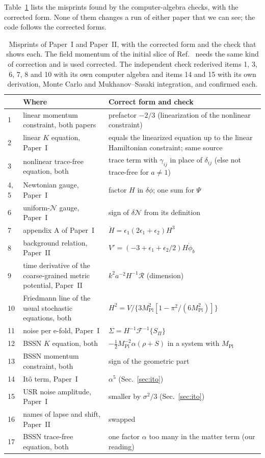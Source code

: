 \documentclass[aps,prd,twocolumn,10pt,superscriptaddress,nofootinbib,longbibliography,floatfix]{revtex4-2}
\newcommand{\Mpl}{M_\mathrm{Pl}}
\newcommand{\Pone}{Paper~I}
\newcommand{\Ptwo}{Paper~II}
\begin{document}
Table~\ref{tab:errata} lists the misprints found by the computer-algebra checks, with the corrected form. None of them changes a run of either paper that we can see; the code follows the corrected forms.

\begin{table}
\caption{Misprints of \Pone{} and \Ptwo{}, with the corrected form and the check that shows each. The field momentum of the initial slice of Ref.~\cite{Launay:2025bd} needs the same kind of correction and is used corrected. The independent check rederived items 1, 3, 6, 7, 8 and 10 with its own computer algebra and items 14 and 15 with its own derivation, Monte Carlo and Mukhanov--Sasaki integration, and confirmed each.}
\label{tab:errata}
\footnotesize
\begin{tabular}{p{}p{}p{}}
\toprule
& Where & Correct form and check \\
\midrule
1 & linear momentum constraint, both papers & prefactor $-2/3$ (linearization of the nonlinear constraint) \\
2 & linear $K$ equation, \Pone{} & equals the linearized equation up to the linear Hamiltonian constraint; same source \\
3 & nonlinear trace-free equation, both & trace term with $\gamma_{ij}$ in place of $\delta_{ij}$ (else not trace-free for $a \ne 1$) \\
4, 5 & Newtonian gauge, \Pone{} & factor $H$ in $\delta\phi$; one sum for $\Psi$ \\
6 & uniform-$\mathcal{N}$ gauge, \Pone{} & sign of $\delta\mathcal{N}$ from its definition \\
7 & appendix A of \Pone{} & $\ddot H = \epsilon_1(2\epsilon_1+\epsilon_2)H^3$ \\
8 & background relation, \Ptwo{} & $V' = (-3+\epsilon_1+\epsilon_2/2)H\dot\phi_b$ \\
9 & time derivative of the coarse-grained metric potential, \Ptwo{} & $k^2a^{-2}H^{-1}\mathcal{R}$ (dimension) \\
10 & Friedmann line of the usual stochastic equations, both & $H^2 = V/\{3\Mpl^2[1-\pi^2/(6\Mpl^2)]\}$ \\
11 & noise per e-fold, \Pone{} & $\Sigma = H^{-1}\mathcal{F}^{-1}\{S_\Pi\}$ \\
12 & BSSN $K$ equation, both & $-\tfrac{1}{2}\Mpl^{-2}\alpha(\rho+S)$ in a system with $\Mpl$ \\
13 & BSSN momentum constraint, both & sign of the geometric part \\
14 & It\^o term, \Pone{} & $\alpha^5$ (Sec.~\ref{sec:ito}) \\
15 & USR noise amplitude, \Pone{} & smaller by $\sigma^2/3$ (Sec.~\ref{sec:ito}) \\
16 & names of lapse and shift, \Ptwo{} & swapped \\
17 & BSSN trace-free equation, both & one factor $\alpha$ too many in the matter term (our reading) \\
\bottomrule
\end{tabular}
\end{table}
\end{document}

